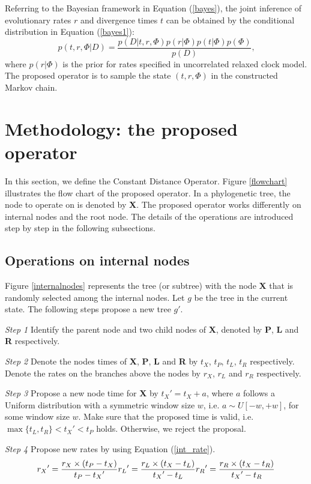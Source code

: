 \documentclass{bmcart}
\newcommand{\alexei}[1]{{\textcolor{green}{#1}}}
\begin{document}
Referring to the Bayesian framework in Equation (\ref{bayes}), the joint inference of evolutionary rates $r$ and divergence times $t$ can be obtained by the conditional distribution in Equation (\ref{bayes1}):
\begin{equation}\label{bayes1}
p(t,r,\Phi |D) = \frac{{p(D|t,r,\Phi )p(r|\Phi )p(t|\Phi )p(\Phi )}}{{p(D)}} \text{,}
\end{equation}
where $p(r|\Phi )$ is the prior for rates specified in uncorrelated relaxed clock model. The proposed operator is to sample the state $(t,r,\Phi)$ in the constructed Markov chain.

\section*{Methodology: the proposed operator}
In this section, we define the Constant Distance Operator. Figure \ref{flowchart} illustrates the flow chart of the proposed operator. In a phylogenetic tree, the node to operate on is denoted by \textbf{X}. The proposed operator works differently on internal nodes and the root node. The details of the operations are introduced step by step in the following subsections.
\subsection*{Operations on internal nodes}
Figure \ref{internalnodes} represents the tree (or subtree) with the node \textbf{X} that is randomly selected among the internal nodes.  Let $g$ be the tree in the current state. The following steps propose a new tree ${g}'$.

\emph{Step 1} Identify the parent node and two child nodes of \textbf{X}, denoted by \textbf{P}, \textbf{L} and \textbf{R} respectively.

\emph{Step 2} Denote the nodes times of \textbf{X}, \textbf{P}, \textbf{L} and \textbf{R} by $t_X$, $t_P$, $t_L$, $t_R$ respectively. Denote the rates on the branches above the nodes by $r_X$, $r_L$ and $r_R$ respectively.

\emph{Step 3} Propose a new node time for \textbf{X} by ${t_X}' = {t_X} + a$, where $a$ follows a Uniform distribution with a symmetric window size $w$, i.e. $a \sim U[ - w, + w]$, for some window size $w$. Make sure that the proposed time is valid, i.e. $\max \{ {t_L},{t_R}\}  < {t_X}' < {t_P}$ holds. Otherwise, we reject the proposal.

\emph{Step 4} Propose new rates by using Equation (\ref{int_rate}).
\begin{equation}
 \label{int_rate}
{r_X}' = \frac{{r_X} \times ({{t_P} - {t_X}})}{{{t_P} - {t_X}'}}\\
{r_L}' = \frac{{{r_L} \times ({{t_X} - {t_L}})}}{{{t_X}' - {t_L}}}\\
{r_R}' = \frac{{{r_R} \times ({{t_X} - {t_R}})}}{{{t_X}' - {t_R}}}
 \end{equation}
\end{document}
